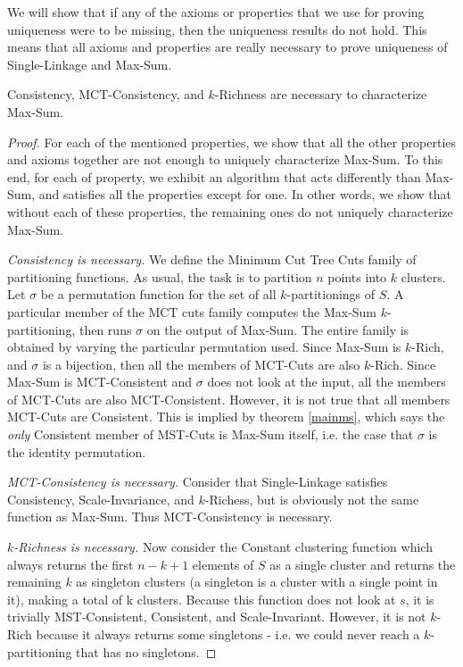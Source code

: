 \documentclass[twoside,11pt]{article}
\begin{document}
We will show that if any of the axioms or properties that we use for proving uniqueness were to be missing, then the uniqueness results do not hold. This means that all axioms and properties are really necessary to prove uniqueness of Single-Linkage and Max-Sum.
\begin{theorem} \label{noteasyms}
Consistency, MCT-Consistency, and $k$-Richness are necessary to characterize Max-Sum.
\end{theorem}
\begin{proof}
For each of the mentioned properties, we show that all the other properties and axioms together are not enough to uniquely characterize Max-Sum. To this end, for each of  property, we exhibit an algorithm that acts differently than Max-Sum, and satisfies all the properties except for one. In other words, we show that without each of these properties, the remaining ones do not uniquely characterize Max-Sum.

\textit{Consistency is necessary.} We define the Minimum Cut Tree Cuts family of partitioning functions. As usual, the task is to partition $n$ points into $k$ clusters. Let $\sigma$ be a permutation function for the set of all $k$-partitionings of $S$. A particular member of the MCT cuts family computes the Max-Sum $k$-partitioning, then runs $\sigma$ on the output of Max-Sum. The entire family is obtained by varying the particular permutation used. Since Max-Sum is $k$-Rich, and $\sigma$ is a bijection, then all the members of MCT-Cuts are also $k$-Rich. Since Max-Sum is MCT-Consistent and $\sigma$ does not look at the input, all the members of MCT-Cuts are also MCT-Consistent. However, it is not true that all members MCT-Cuts are Consistent. This is implied by theorem \ref{mainms}, which says the \textit{only} Consistent member of MST-Cuts is Max-Sum itself, i.e. the case that $\sigma$ is the identity permutation.

\textit{MCT-Consistency is necessary.} Consider that Single-Linkage satisfies Consistency, Scale-Invariance, and $k$-Richess, but is obviously not the same function as Max-Sum. Thus MCT-Consistency is necessary.

\textit{$k$-Richness is necessary.} Now consider the Constant clustering function which always returns the first $n-k+1$ elements of $S$ as a single cluster and returns the remaining $k$ as singleton clusters (a singleton is a cluster with a single point in it), making a total of k clusters. Because this function does not look at $s$, it is trivially MST-Consistent, Consistent, and Scale-Invariant. However, it is not $k$-Rich because it always returns some singletons - i.e. we could never reach a $k$-partitioning that has no singletons.
\end{proof}
\end{document}
